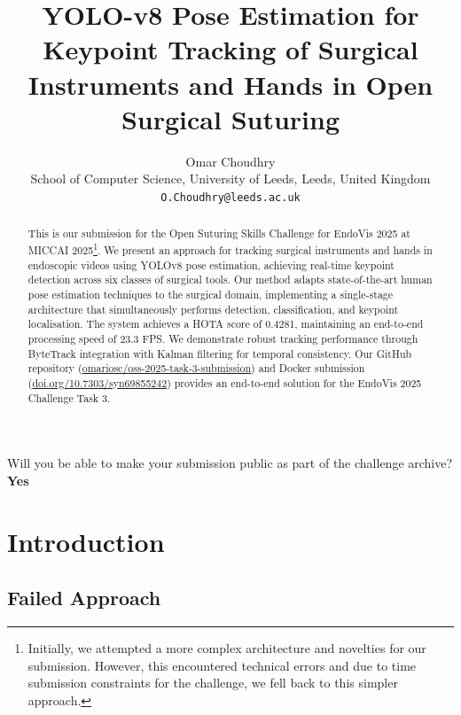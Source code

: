 \documentclass[11pt]{article}
\title{YOLO-v8 Pose Estimation for Keypoint Tracking of Surgical Instruments and Hands in Open Surgical Suturing}
\author{
    Omar Choudhry \\
    School of Computer Science, University of Leeds, Leeds, United Kingdom \\
    \texttt{O.Choudhry@leeds.ac.uk}
}
\begin{document}
\maketitle

Will you be able to make your submission public as part of the challenge archive? \textbf{Yes}

\vspace{5mm}

\begin{abstract}
This is our submission for the Open Suturing Skills Challenge for EndoVis 2025 at MICCAI 2025\footnote{Initially, we attempted a more complex architecture and novelties for our submission. However, this encountered technical errors and due to time submission constraints for the challenge, we fell back to this simpler approach.}. We present an approach for tracking surgical instruments and hands in endoscopic videos using YOLOv8 pose estimation, achieving real-time keypoint detection across six classes of surgical tools. Our method adapts state-of-the-art human pose estimation techniques to the surgical domain, implementing a single-stage architecture that simultaneously performs detection, classification, and keypoint localisation. The system achieves a HOTA score of 0.4281, maintaining an end-to-end processing speed of 23.3 FPS. We demonstrate robust tracking performance through ByteTrack integration with Kalman filtering for temporal consistency. Our GitHub repository (\href{https://github.com/omariosc/oss-2025-task-3-submission}{omariosc/oss-2025-task-3-submission}) and Docker submission (\href{https://doi.org/10.7303/syn69855242}{doi.org/10.7303/syn69855242}) provides an end-to-end solution for the EndoVis 2025 Challenge Task 3.
\end{abstract}

\section{Introduction}

\subsection{Failed Approach}
\end{document}

